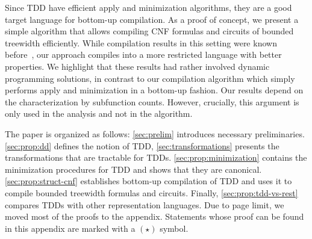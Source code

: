 \documentclass[a4paper,UKenglish,cleveref, autoref, thm-restate]{lipics-v2021}
\newcommand{\istefan}[1]{\todo[inline,color=pink]{Stefan: #1}}
\begin{document}

Since TDD have efficient apply and minimization algorithms, they are a good target language for bottom-up compilation.
As a proof of concept, we present a simple algorithm that allows compiling CNF formulas and circuits of bounded treewidth efficiently. While compilation results in this setting were known before~\cite{Darwiche04,PipatsrisawatD10,BovaCMS15,AmarilliCMS20,BovaS17}, our approach compiles into a more restricted language with better properties. We highlight that these results had rather involved dynamic programming solutions, in contrast to our compilation algorithm which simply performs apply and minimization in a bottom-up fashion.
Our results depend on the characterization by subfunction counts. However, crucially, this argument is only used in the analysis and not in the algorithm.  



The paper is organized as follows: \cref{sec:prelim} introduces necessary preliminaries. \cref{sec:prop:dd} defines the notion of TDD, \cref{sec:transformations} presents the transformations that are tractable for TDDs. \cref{sec:prop:minimization} contains the minimization procedures for TDD and shows that they are canonical. \cref{sec:prop:struct-cnf} establishes bottom-up compilation of TDD and uses it to compile bounded treewidth formulas and circuits. Finally, \cref{sec:prop:tdd-vs-rest} compares TDDs with other representation languages. Due to page limit, we moved most of the proofs to the appendix. Statements whose proof can be found in this appendix are marked with a $(\star)$ symbol. 

\end{document}
